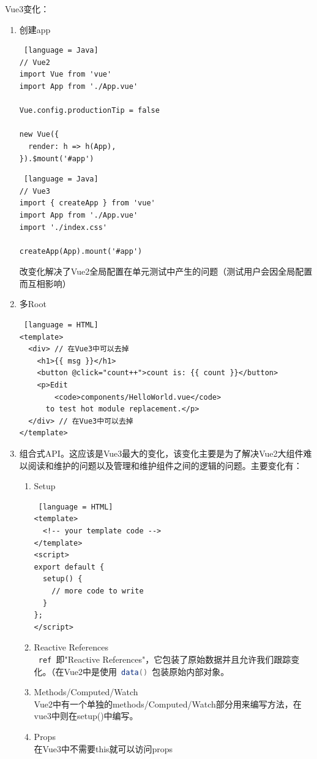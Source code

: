 Vue3变化：
\begin{enumerate}
    \item 创建app
          \begin{lstlisting} [language = Java]
// Vue2
import Vue from 'vue'
import App from './App.vue'

Vue.config.productionTip = false

new Vue({
  render: h => h(App),
}).$mount('#app')
    \end{lstlisting}
          \begin{lstlisting} [language = Java]
// Vue3
import { createApp } from 'vue'
import App from './App.vue'
import './index.css'

createApp(App).mount('#app')
    \end{lstlisting}
          改变化解决了Vue2全局配置在单元测试中产生的问题（测试用户会因全局配置而互相影响）
    \item 多Root
\begin{lstlisting} [language = HTML]
<template>
  <div> // 在Vue3中可以去掉
    <h1>{{ msg }}</h1>
    <button @click="count++">count is: {{ count }}</button>
    <p>Edit 
        <code>components/HelloWorld.vue</code> 
      to test hot module replacement.</p>
  </div> // 在Vue3中可以去掉
</template>
\end{lstlisting}
    \item 组合式API。这应该是Vue3最大的变化，该变化主要是为了解决Vue2大组件难以阅读和维护的问题以及管理和维护组件之间的逻辑的问题。主要变化有：
    \begin{enumerate}
        \item Setup
            \begin{lstlisting} [language = HTML]
<template>
  <!-- your template code -->
</template>
<script>
export default {
  setup() {
    // more code to write
  }
};
</script>
            \end{lstlisting}
        \item Reactive References\\
        \lstinline[language = Java]| ref |即"Reactive References"，它包装了原始数据并且允许我们跟踪变化。（在Vue2中是使用\lstinline[language = Java]| data() |包装原始内部对象。
        \item Methods/Computed/Watch\\
        Vue2中有一个单独的methods/Computed/Watch部分用来编写方法，在vue3中则在setup()中编写。
        \item Props\\
        在Vue3中不需要this就可以访问props

\end{enumerate}
\end{enumerate}

